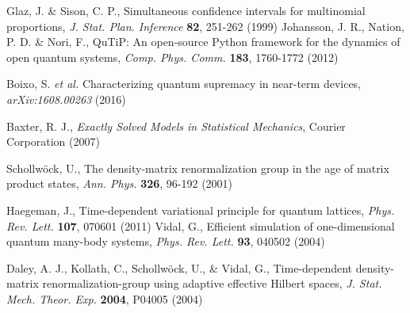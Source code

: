 \documentclass[prl,nobalancelastpage,twocolumn,superscriptaddress,nofootinbib]{revtex4}
\begin{document}
\begin{footnotesize}
\begin{thebibliography}{}
 Glaz, J. \& Sison, C. P., Simultaneous confidence intervals for multinomial proportions, \emph{J. Stat. Plan. Inference} \textbf{82}, 251-262 (1999)
 Johansson, J. R., Nation, P. D. \& Nori, F., QuTiP: An open-source Python framework for the dynamics of open quantum systems, \emph{Comp. Phys. Comm.} \textbf{183}, 1760-1772 (2012)

 Boixo, S. \emph{et al.} Characterizing quantum supremacy in near-term devices, \emph{arXiv:1608.00263} (2016)

 Baxter, R. J., \emph{Exactly Solved Models in Statistical Mechanics}, Courier Corporation (2007)

 Schollw\"ock, U., The density-matrix renormalization group in the age of matrix product states, \emph{Ann. Phys.} \textbf{326}, 96-192 (2001)

 Haegeman, J., Time-dependent variational principle for quantum lattices, \emph{Phys. Rev. Lett.} \textbf{107}, 070601 (2011)
 Vidal, G., Efficient simulation of one-dimensional quantum many-body systems, \emph{Phys. Rev. Lett.} \textbf{93}, 040502 (2004)

 Daley, A. J., Kollath, C., Schollw\"ock, U., \& Vidal, G., Time-dependent density-matrix renormalization-group using adaptive effective Hilbert spaces, \emph{J. Stat. Mech. Theor. Exp.} \textbf{2004}, P04005 (2004)

\end{thebibliography}


\end{footnotesize}
\end{document}
